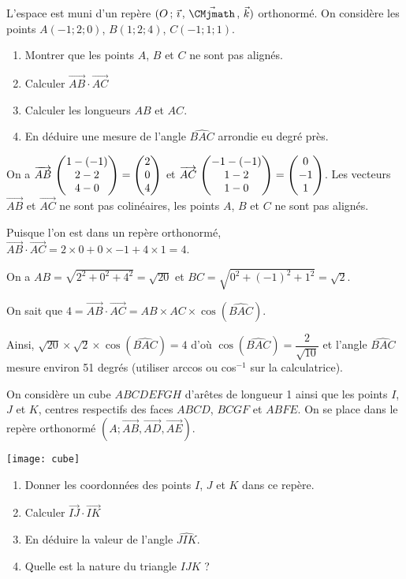 \documentclass[11pt,fleqn, openany]{book} %
\begin{document}
\begin{exercise}L'espace est muni d'un repère $\Oijk$ orthonormé. On considère les points $A(-1;2;0)$, $B(1;2;4)$, $C(-1;1;1)$.
\begin{enumerate}
\item Montrer que les points $A$, $B$ et $C$ ne sont pas alignés.
\item Calculer $\overrightarrow{AB}\cdot \overrightarrow{AC}$
\item Calculer les longueurs $AB$ et $AC$.
\item En déduire une mesure de l'angle $\widehat{BAC}$ arrondie eu degré près.
\end{enumerate}\end{exercise}

\begin{solution}On a $\coorde{AB}{1-(-1)}{2-2}{4-0}=\coordbe{2}{0}{4}$ et $\coorde{AC}{-1-(-1)}{1-2}{1-0}=\coordbe{0}{-1}{1}$. Les vecteurs $\overrightarrow{AB}$ et $\overrightarrow{AC}$ ne sont pas colinéaires, les points $A$, $B$ et $C$ ne sont pas alignés.

Puisque l'on est dans un repère orthonormé, $\overrightarrow{AB}\cdot \overrightarrow{AC}=2 \times 0+0 \times -1 + 4 \times 1 = 4$.

On a $AB = \sqrt{2^2+0^2+4^2}=\sqrt{20}$ et $BC=\sqrt{0^2+(-1)^2+1^2}=\sqrt{2}$.

On sait  que $4=\overrightarrow{AB}\cdot \overrightarrow{AC}=AB \times AC \times \cos (\widehat{BAC})$. 

Ainsi, $\sqrt{20} \times \sqrt{2} \times \cos (\widehat{BAC}) = 4$ d'où $\cos (\widehat{BAC})=\dfrac{2}{\sqrt{10}}$ et l'angle $\widehat{BAC}$ mesure environ 51 degrés (utiliser arccos ou cos$^{-1}$ sur la calculatrice).\end{solution}





\begin{exercise}
On considère un cube $ABCDEFGH$ d'arêtes de longueur 1 ainsi que les points $I$, $J$ et $K$, centres respectifs des faces $ABCD$, $BCGF$ et $ABFE$. On se place dans le repère orthonormé $(A;\overrightarrow{AB},\overrightarrow{AD},\overrightarrow{AE})$.

\begin{minipage}{0.4\linewidth}
\begin{center}
\texttt{[image: cube]}
\end{center}\end{minipage}\hfill \begin{minipage}{0.5\linewidth}
\begin{enumerate}
\item Donner les coordonnées des points $I$, $J$ et $K$ dans ce repère.
\item Calculer $\overrightarrow{IJ} \cdot \overrightarrow{IK}$
\item En déduire la valeur de l'angle $\widehat{JIK}$.
\item Quelle est la nature du triangle $IJK$ ?
\end{enumerate}
\end{minipage}

\end{exercise}
\end{document}
